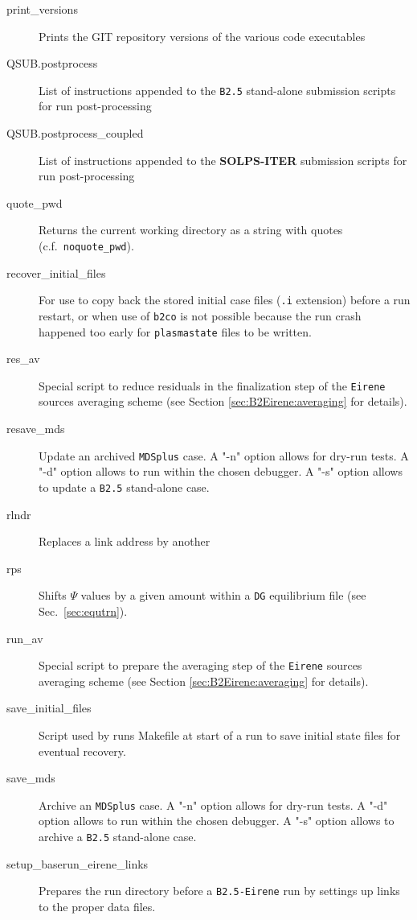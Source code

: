 \documentclass[a4paper,10pt]{report}
\newcommand\SOLPSITER{{\bf SOLPS-ITER} }
\begin{document}
\begin{itemize}
\begin{description}
  \item[print\_versions] Prints the GIT repository versions of the various code executables
  \item[QSUB.postprocess] List of instructions appended to the {\tt B2.5} stand-alone submission scripts for run post-processing
  \item[QSUB.postprocess\_coupled] List of instructions appended to the \SOLPSITER submission scripts for run post-processing
  \item[quote\_pwd] Returns the current working directory as a string with quotes (c.f.\ {\tt noquote\_pwd}).
  \item[recover\_initial\_files] For use to copy back the stored initial case files ({\tt .i} extension) before a run restart, or when use of {\tt b2co} is not possible because the run crash happened too early for {\tt plasmastate} files to be written.
  \item[res\_av] Special script to reduce residuals in the finalization step of the {\tt Eirene} sources averaging scheme (see Section \ref{sec:B2Eirene:averaging} for details).
  \item[resave\_mds] Update an archived {\tt MDSplus} case. A "-n" option allows for dry-run tests. A "-d" option allows to run within the chosen debugger. A "-s" option allows to update a {\tt B2.5} stand-alone case.
  \item[rlndr] Replaces a link address by another
  \item[rps] Shifts $\Psi$ values by a given amount within a {\tt DG} equilibrium file (see Sec.~\ref{sec:equtrn}).
  \item[run\_av] Special script to prepare the averaging step of the {\tt Eirene} sources averaging scheme (see Section \ref{sec:B2Eirene:averaging} for details).
  \item[save\_initial\_files] Script used by runs Makefile at start of a run to save initial state files for eventual recovery.
  \item[save\_mds] Archive an {\tt MDSplus} case. A "-n" option allows for dry-run tests. A "-d" option allows to run within the chosen debugger. A "-s" option allows to archive a {\tt B2.5} stand-alone case.
  \item[setup\_baserun\_eirene\_links] Prepares the run directory before a {\tt B2.5-Eirene} run by settings up links to the proper data files.

\end{description}
\end{itemize}
\end{document}
